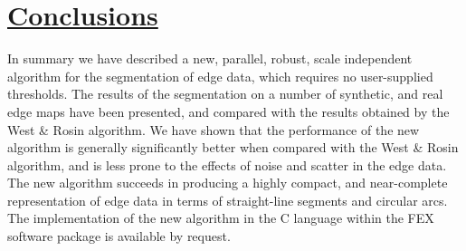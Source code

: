 \section{\underline{Conclusions}}

 In summary we have described a new, parallel, robust, scale independent
algorithm for the segmentation of edge data, which requires no user-supplied
thresholds. The results of the segmentation on a number of synthetic, and real 
edge maps have been presented, and compared with the results obtained by the 
West \& Rosin algorithm. We have shown that the 
performance of the new algorithm is generally significantly better when 
compared with the West \& Rosin algorithm, and is less prone to the effects of
noise and scatter in the edge data. The new algorithm succeeds in producing a 
highly compact, and near-complete representation of edge data in terms of 
straight-line segments and circular arcs. The implementation of the new 
algorithm in the C language within the FEX software package is available by 
request. 

